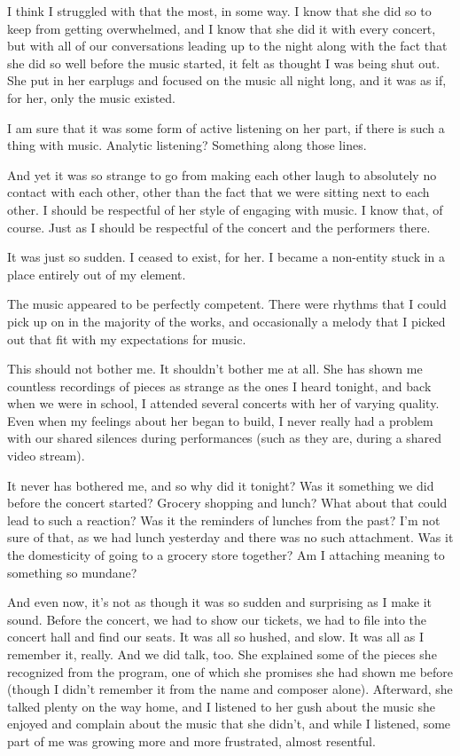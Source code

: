 I think I struggled with that the most, in some way. I know that she did so to keep from getting overwhelmed, and I know that she did it with every concert, but with all of our conversations leading up to the night along with the fact that she did so well before the music started, it felt as thought I was being shut out. She put in her earplugs and focused on the music all night long, and it was as if, for her, only the music existed.

I am sure that it was some form of active listening on her part, if there is such a thing with music. Analytic listening? Something along those lines.

And yet it was so strange to go from making each other laugh to absolutely no contact with each other, other than the fact that we were sitting next to each other. I should be respectful of her style of engaging with music. I know that, of course. Just as I should be respectful of the concert and the performers there.

It was just so sudden. I ceased to exist, for her. I became a non-entity stuck in a place entirely out of my element.

The music appeared to be perfectly competent. There were rhythms that I could pick up on in the majority of the works, and occasionally a melody that I picked out that fit with my expectations for music.

This should not bother me. It shouldn't bother me at all. She has shown me countless recordings of pieces as strange as the ones I heard tonight, and back when we were in school, I attended several concerts with her of varying quality. Even when my feelings about her began to build, I never really had a problem with our shared silences during performances (such as they are, during a shared video stream).

It never has bothered me, and so why did it tonight? Was it something we did before the concert started? Grocery shopping and lunch? What about that could lead to such a reaction? Was it the reminders of lunches from the past? I'm not sure of that, as we had lunch yesterday and there was no such attachment. Was it the domesticity of going to a grocery store together? Am I attaching meaning to something so mundane?

And even now, it's not as though it was so sudden and surprising as I make it sound. Before the concert, we had to show our tickets, we had to file into the concert hall and find our seats. It was all so hushed, and slow. It was all as I remember it, really. And we did talk, too. She explained some of the pieces she recognized from the program, one of which she promises she had shown me before (though I didn't remember it from the name and composer alone). Afterward, she talked plenty on the way home, and I listened to her gush about the music she enjoyed and complain about the music that she didn't, and while I listened, some part of me was growing more and more frustrated, almost resentful.

